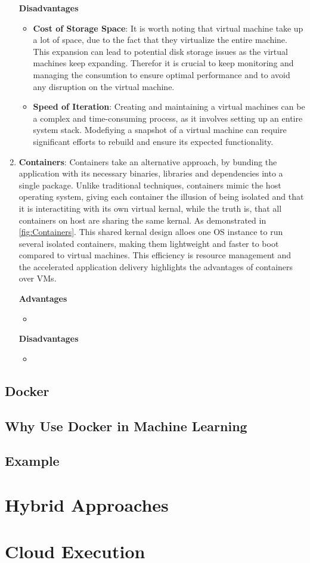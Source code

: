 \begin{enumerate}
          \textbf{Disadvantages}
          \begin{itemize}
              \item \textbf{Cost of Storage Space}: It is worth noting that virtual machine take up a lot of space, due to the fact that they virtualize the entire machine. This expansion can lead to potential disk storage issues as the virtual machines keep expanding. Therefor it is crucial to keep monitoring and managing the consumtion to ensure optimal performance and to avoid any disruption on the virtual machine.
              \item \textbf{Speed of Iteration}: Creating and maintaining a virtual machines can be a complex and time-consuming process, as it involves setting up an entire system stack. Modefiying a snapshot of a virtual machine can require significant efforts to rebuild and ensure its expected functionality.  
          \end{itemize}
    \item \textbf{Containers}: Containers take an alternative approach, by bunding the application with its necessary binaries, libraries and dependencies into a single package. Unlike traditional techniques, containers mimic the host operating system, giving each container the illusion of being isolated and that it is interactiting with its own virtual kernal, while the truth is, that all containers on host are sharing the same kernal. As demonstrated in \autoref{fig:Containers}. This shared kernal design alloes one \ac{OS} instance to run several isolated containers, making them lightweight and faster to boot compared to virtual machines. This efficiency is resource management and the accelerated application delivery highlights the advantages of containers over \ac{VMs}.
          
          \newline
          \textbf{Advantages}
          \begin{itemize}
              \item
          \end{itemize}

          \textbf{Disadvantages}
          \begin{itemize}
              \item
          \end{itemize}
\end{enumerate}
\subsection{Docker}
\subsection{Why Use Docker in Machine Learning}
\subsection{Example}

\newpage

\section{Hybrid Approaches}

\section{Cloud Execution}